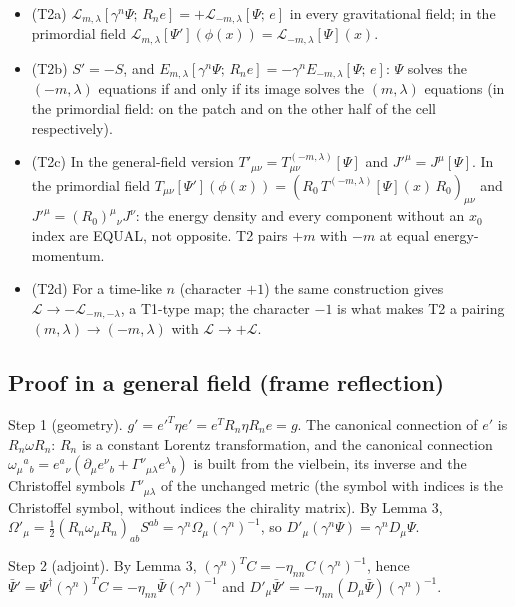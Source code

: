 \documentclass[11pt]{article}
\begin{document}
\begin{itemize}
\item (T2a) $\mathcal{L}_{m,\lambda}[\gamma^n\Psi;\,R_ne] = +\mathcal{L}_{-m,\lambda}[\Psi;\,e]$ in every gravitational field; in the primordial field $\mathcal{L}_{m,\lambda}[\Psi'](\phi(x)) = \mathcal{L}_{-m,\lambda}[\Psi](x)$.
\item (T2b) $S' = -S$, and $E_{m,\lambda}[\gamma^n\Psi;\,R_ne] = -\gamma^nE_{-m,\lambda}[\Psi;\,e]$: $\Psi$ solves the $(-m,\lambda)$ equations if and only if its image solves the $(m,\lambda)$ equations (in the primordial field: on the patch and on the other half of the cell respectively).
\item (T2c) In the general-field version $T'_{\mu\nu} = T^{(-m,\lambda)}_{\mu\nu}[\Psi]$ and $J'^\mu = J^\mu[\Psi]$. In the primordial field $T_{\mu\nu}[\Psi'](\phi(x)) = (R_0\,T^{(-m,\lambda)}[\Psi](x)\,R_0)_{\mu\nu}$ and $J'^\mu = (R_0)^\mu{}_\nu J^\nu$: the energy density and every component without an $x_0$ index are EQUAL, not opposite. T2 pairs $+m$ with $-m$ at equal energy-momentum.
\item (T2d) For a time-like $n$ (character $+1$) the same construction gives $\mathcal{L} \to -\mathcal{L}_{-m,-\lambda}$, a T1-type map; the character $-1$ is what makes T2 a pairing $(m,\lambda) \to (-m,\lambda)$ with $\mathcal{L} \to +\mathcal{L}$.
\end{itemize}

\subsection{Proof in a general field (frame reflection)}

Step 1 (geometry). $g' = e'^T\eta e' = e^TR_n\eta R_ne = g$. The canonical connection of $e'$ is $R_n\omega R_n$: $R_n$ is a constant Lorentz transformation, and the canonical connection $\omega_\mu{}^a{}_b = e^a{}_\nu(\partial_\mu e^\nu{}_b + \Gamma^\nu{}_{\mu\lambda}e^\lambda{}_b)$ is built from the vielbein, its inverse and the Christoffel symbols $\Gamma^\nu{}_{\mu\lambda}$ of the unchanged metric (the symbol with indices is the Christoffel symbol, without indices the chirality matrix). By Lemma 3, $\Omega'_\mu = \frac12(R_n\omega_\mu R_n)_{ab}S^{ab} = \gamma^n\Omega_\mu(\gamma^n)^{-1}$, so $D'_\mu(\gamma^n\Psi) = \gamma^nD_\mu\Psi$.

Step 2 (adjoint). By Lemma 3, $(\gamma^n)^TC = -\eta_{nn}C(\gamma^n)^{-1}$, hence $\bar\Psi' = \Psi^\dagger(\gamma^n)^TC = -\eta_{nn}\bar\Psi(\gamma^n)^{-1}$ and $D'_\mu\bar\Psi' = -\eta_{nn}(D_\mu\bar\Psi)(\gamma^n)^{-1}$.
\end{document}
